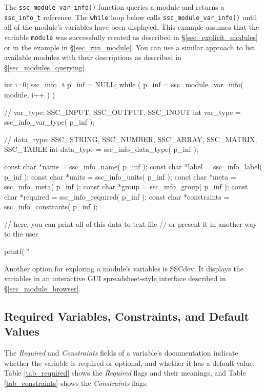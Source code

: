 \documentclass{article}
\begin{document}
The \texttt{ssc\_module\_var\_info()} function queries a module and returns a \texttt{ssc\_info\_t} reference. The \texttt{while} loop below calls \texttt{ssc\_module\_var\_info()} until all of the module's variables have been displayed. This example assumes that the variable \texttt{module} was successfully created as described in \S\ref{sec_explicit_modules} or in the example in \S\ref{sec_run_module}. You can use a similar approach to list available modules with their descriptions as described in \S\ref{sec_modules_querying}.

\begin{verbatimtab}[4]
int i=0;
ssc_info_t p_inf = NULL;
while ( p_inf = ssc_module_var_info( module, i++ ) )
{
	// var_type: SSC_INPUT, SSC_OUTPUT, SSC_INOUT
	int var_type = ssc_info_var_type( p_inf );

	// data_type: SSC_STRING, SSC_NUMBER, SSC_ARRAY, SSC_MATRIX, SSC_TABLE   
	int data_type = ssc_info_data_type( p_inf );
      
	const char *name = ssc_info_name( p_inf );
	const char *label = ssc_info_label( p_inf );
	const char *units = ssc_info_units( p_inf );
	const char *meta = ssc_info_meta( p_inf );
	const char *group = ssc_info_group( p_inf );
	const char *required = ssc_info_required( p_inf );
	const char *constraints = ssc_info_constrants( p_inf );

	// here, you can print all of this data to text file
	// or present it in another way to the user

	printf( "%
}

\end{verbatimtab}

Another option for exploring a module's variables is SSCdev. It displays the variables in an interactive GUI spreadsheet-style interface described in \S\ref{sec_module_browser}.

\subsection{Required Variables, Constraints, and Default Values}
\label{sec_def_const}

The \emph{Required} and \emph{Constraints} fields of a variable's documentation indicate whether the variable is required or optional, and whether it has a default value. Table \ref{tab_required} shows the \emph{Required} flags and their meanings, and Table \ref{tab_constraints} shows the \emph{Constraints} flags. 
\end{document}

